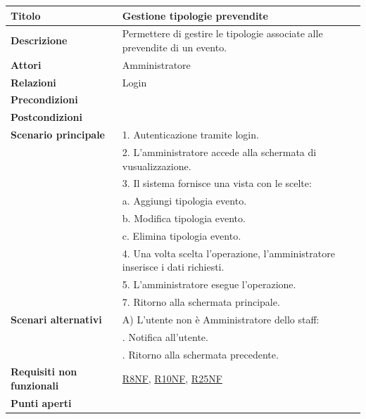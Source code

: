\documentclass[a4paper]{article}
\begin{document}


  \begin{center}
    \begin{tabularx}{1\textwidth}{l|X}
        \textbf{Titolo} & Gestione tipologie prevendite \\
        \hline
        \textbf{Descrizione} & Permettere di gestire le tipologie associate alle prevendite di un evento. \\
        \hline
        \textbf{Attori} & Amministratore \\
        \hline
        \textbf{Relazioni} & Login \\
        \hline
        \textbf{Precondizioni} &  \\
        \hline
        \textbf{Postcondizioni} &  \\
        \hline
        \textbf{Scenario principale} & 1. Autenticazione tramite login. \\
                                     & 2. L'amministratore accede alla schermata di vusualizzazione. \\
                                     & 3. Il sistema fornisce una vista con le scelte: \\
                                     & \quad a. Aggiungi tipologia evento.\\
                                     & \quad b. Modifica tipologia evento.\\
                                     & \quad c. Elimina tipologia evento.\\
                                     & 4. Una volta scelta l'operazione, l'amministratore inserisce i dati richiesti. \\
                                     & 5. L'amministratore esegue l'operazione.\\
                                     & 7. Ritorno alla schermata principale.\\
        \hline
        \textbf{Scenari alternativi} & A) L'utente non è Amministratore dello staff: \\
                                     & \quad 1. Notifica all'utente. \\
                                     & \quad 2. Ritorno alla schermata precedente. \\
        \hline
        \textbf{Requisiti non funzionali} & \hyperlink{R8NF}{R8NF}, \hyperlink{R10NF}{R10NF}, \hyperlink{R25NF}{R25NF} \\
        \hline
        \textbf{Punti aperti} & \\
        \hline
    \end{tabularx}
  \end{center}
\end{document}
